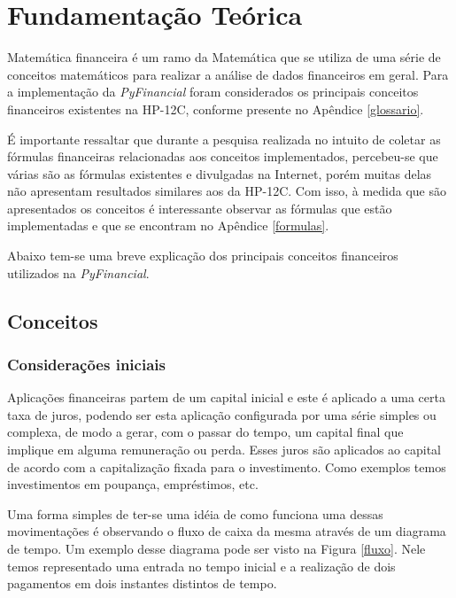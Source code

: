 \chapter{Fundamentação Teórica}

Matemática financeira é um ramo da Matemática que se utiliza de uma série de conceitos matemáticos para realizar a análise de dados financeiros em geral. Para a implementação da \textit{PyFinancial} foram considerados os principais conceitos financeiros existentes na HP-12C, conforme presente no Apêndice \ref{glossario}.

É importante ressaltar que durante a pesquisa realizada no intuito de coletar as fórmulas financeiras relacionadas aos conceitos implementados, percebeu-se que várias são as fórmulas existentes e divulgadas na Internet, porém muitas delas não apresentam resultados similares aos da HP-12C. Com isso, à medida que são apresentados os conceitos é interessante observar as fórmulas que estão implementadas e que se encontram no Apêndice \ref{formulas}.

Abaixo tem-se uma breve explicação dos principais conceitos financeiros utilizados na \textit{PyFinancial}.

\section{Conceitos}

\subsection{Considerações iniciais}

Aplicações financeiras partem de um capital inicial e este é aplicado a uma certa taxa de juros, podendo ser esta aplicação configurada por uma série simples ou complexa, de modo a gerar, com o passar do tempo, um capital final que implique em alguma remuneração ou perda. Esses juros são aplicados ao capital de acordo com a capitalização fixada para o investimento. Como exemplos temos investimentos em poupança, empréstimos, etc.

Uma forma simples de ter-se uma idéia de como funciona uma dessas movimentações é observando o fluxo de caixa da mesma através de um diagrama de tempo. Um exemplo desse diagrama pode ser visto na Figura \ref{fluxo}. Nele temos representado uma entrada no tempo inicial e a realização de dois pagamentos em dois instantes distintos de tempo.

